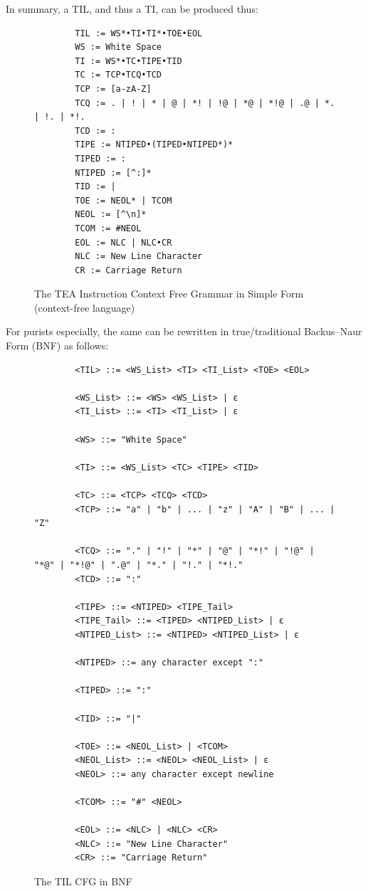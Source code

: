 \documentclass[a4paper, 18pt]{book} %
\begin{document}
In summary, a TIL, and thus a TI, can be produced thus:

    \begin{figure}[H]
  \centering
  \begin{tcolorbox}[myterminalstyle, title=TEA Instruction Line (Simple Grammar)]
  \begin{verbatim}
	    TIL := WS*•TI•TI*•TOE•EOL
	    WS := White Space
	    TI := WS*•TC•TIPE•TID
	    TC := TCP•TCQ•TCD
	    TCP := [a-zA-Z]
	    TCQ := . | ! | * | @ | *! | !@ | *@ | *!@ | .@ | *. | !. | *!.  
	    TCD := :
	    TIPE := NTIPED•(TIPED•NTIPED*)*
	    TIPED := :
	    NTIPED := [^:]*
	    TID := |
	    TOE := NEOL* | TCOM
	    NEOL := [^\n]*
	    TCOM := #NEOL
	    EOL := NLC | NLC•CR
	    NLC := New Line Character
	    CR := Carriage Return
  \end{verbatim}
  \end{tcolorbox}
  \caption{The TEA Instruction Context Free Grammar in Simple Form (context-free language)}
  \label{FIG3}
\end{figure}


For purists especially, the same can be rewritten in true/traditional Backus–Naur Form (BNF) as follows:


    \begin{figure}[H]
  \centering
  \begin{tcolorbox}[myterminalstyle, title=TEA Instruction Line (BNF Grammar)]
  \begin{verbatim}
		<TIL> ::= <WS_List> <TI> <TI_List> <TOE> <EOL>
		
		<WS_List> ::= <WS> <WS_List> | ε
		<TI_List> ::= <TI> <TI_List> | ε
		
		<WS> ::= "White Space"
		
		<TI> ::= <WS_List> <TC> <TIPE> <TID>
		
		<TC> ::= <TCP> <TCQ> <TCD>
		<TCP> ::= "a" | "b" | ... | "z" | "A" | "B" | ... | "Z"

		<TCQ> ::= "." | "!" | "*" | "@" | "*!" | "!@" | "*@" | "*!@" | ".@" | "*." | "!." | "*!."    
		<TCD> ::= ":"
		
		<TIPE> ::= <NTIPED> <TIPE_Tail>
		<TIPE_Tail> ::= <TIPED> <NTIPED_List> | ε
		<NTIPED_List> ::= <NTIPED> <NTIPED_List> | ε
		
		<NTIPED> ::= any character except ":"
		
		<TIPED> ::= ":"
		
		<TID> ::= "|"
		
		<TOE> ::= <NEOL_List> | <TCOM>
		<NEOL_List> ::= <NEOL> <NEOL_List> | ε
		<NEOL> ::= any character except newline
		
		<TCOM> ::= "#" <NEOL>
		
		<EOL> ::= <NLC> | <NLC> <CR>
		<NLC> ::= "New Line Character"
		<CR> ::= "Carriage Return"
  \end{verbatim}
  \end{tcolorbox}
  \caption{The TIL CFG in BNF}
  \label{FIG4}
\end{figure}
\end{document}
